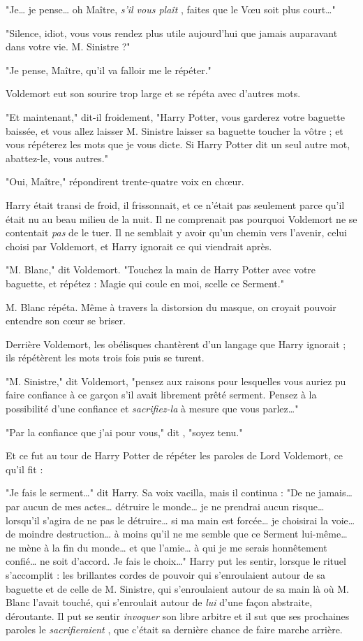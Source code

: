 "Je… je pense… oh Maître, \emph{s'il vous plaît} , faites que le Vœu soit plus court…"

"Silence, idiot, vous vous rendez plus utile aujourd'hui que jamais auparavant dans votre vie. M. Sinistre ?"

"Je pense, Maître, qu'il va falloir me le répéter."

Voldemort eut son sourire trop large et se répéta avec d'autres mots.

"Et maintenant," dit-il froidement, "Harry Potter, vous garderez votre baguette baissée, et vous allez laisser M. Sinistre laisser sa baguette toucher la vôtre ; et vous répéterez les mots que je vous dicte. Si Harry Potter dit un seul autre mot, abattez-le, vous autres."

"Oui, Maître," répondirent trente-quatre voix en chœur.

Harry était transi de froid, il frissonnait, et ce n'était pas seulement parce qu'il était nu au beau milieu de la nuit. Il ne comprenait pas pourquoi Voldemort ne se contentait \emph{pas}  de le tuer. Il ne semblait y avoir qu'un chemin vers l'avenir, celui choisi par Voldemort, et Harry ignorait ce qui viendrait après.

"M. Blanc," dit Voldemort. "Touchez la main de Harry Potter avec votre baguette, et répétez : Magie qui coule en moi, scelle ce Serment."

M. Blanc répéta. Même à travers la distorsion du masque, on croyait pouvoir entendre son cœur se briser.

Derrière Voldemort, les obélisques chantèrent d'un langage que Harry ignorait ; ils répétèrent les mots trois fois puis se turent.

"M. Sinistre," dit Voldemort, "pensez aux raisons pour lesquelles vous auriez pu faire confiance à ce garçon s'il avait librement prêté serment. Pensez à la possibilité d'une confiance et \emph{sacrifiez-la}  à mesure que vous parlez…"

"Par la confiance que j'ai pour vous," dit , "soyez tenu."

Et ce fut au tour de Harry Potter de répéter les paroles de Lord Voldemort, ce qu'il fit :

"Je fais le serment…" dit Harry. Sa voix vacilla, mais il continua : "De ne jamais… par aucun de mes actes… détruire le monde… je ne prendrai aucun risque… lorsqu'il s'agira de ne pas le détruire… si ma main est forcée… je choisirai la voie… de moindre destruction… à moins qu'il ne me semble que ce Serment lui-même… ne mène à la fin du monde… et que l'amie… à qui je me serais honnêtement confié… ne soit d'accord. Je fais le choix…" Harry put les sentir, lorsque le rituel s'accomplit : les brillantes cordes de pouvoir qui s'enroulaient autour de sa baguette et de celle de M. Sinistre, qui s'enroulaient autour de sa main là où M. Blanc l'avait touché, qui s'enroulait autour de \emph{lui}  d'une façon abstraite, déroutante. Il put se sentir \emph{invoquer}  son libre arbitre et il sut que ses prochaines paroles le \emph{sacrifieraient} , que c'était sa dernière chance de faire marche arrière.

